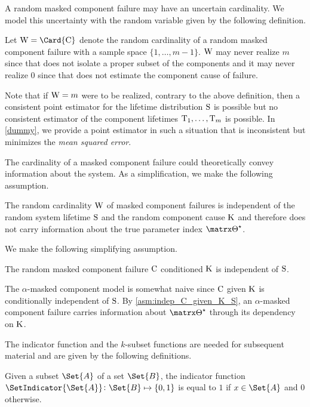 \documentclass[../main.tex]{subfiles}
\begin{document}
A random masked component failure may have an uncertain cardinality.
We model this uncertainty with the random variable given by the following definition.
\begin{definition}
\label{def:rv_W}
Let $\RV{W} = \Card{\rvcand}$ denote the random cardinality of a random masked component failure with a sample space $\{1,\ldots,m-1\}$.
$\mathrm{W}$ may never realize $m$ since that does not isolate a proper subset of the components and it may never realize $0$ since that does not estimate the component cause of failure.
\end{definition}
Note that if $\mathrm{W}=m$ were to be realized, contrary to the above definition, then a consistent point estimator for the lifetime distribution $\mathrm{S}$ is possible but no consistent estimator of the component lifetimes $\mathrm{T}_1,\ldots,\mathrm{T}_m$ is possible.
In \cref{dummy}, we provide a point estimator in such a situation that is inconsistent but minimizes the \emph{mean squared error}.

The cardinality of a masked component failure could theoretically convey information about the system.
As a simplification, we make the following assumption.
\begin{assumption}
\label{asm:indep_W_S}
The random cardinality $\mathrm{W}$ of masked component failures is independent of the random system lifetime $\mathrm{S}$ and the random component cause $\mathrm{K}$ and therefore does not carry information about the true parameter index $\tparam\sysparam$.
\end{assumption}

We make the following simplifying assumption.
\begin{assumption}
\label{asm:indep_C_given_K_S}
The random masked component failure $\mathrm{C}$ conditioned $\mathrm{K}$ is independent of $\mathrm{S}$.
\end{assumption}
The $\alpha$-masked component model is somewhat naive since $\mathrm{C}$ given $\mathrm{K}$ is conditionally independent of $\mathrm{S}$.
By \cref{asm:indep_C_given_K_S}, an $\alpha$-masked component failure carries information about $\tparam\sysparam$ through its dependency on $\mathrm{K}$.

The indicator function and the $k$-subset functions are needed for subsequent material and are given by the following definitions.
\begin{definition}
	Given a subset $\Set{A}$ of a set $\Set{B}$, the indicator function $\SetIndicator{\Set{A}} \colon \Set{B} \mapsto \{0,1\}$
	is equal to $1$ if $x \in \Set{A}$ and $0$ otherwise.
\end{definition}
\end{document}
